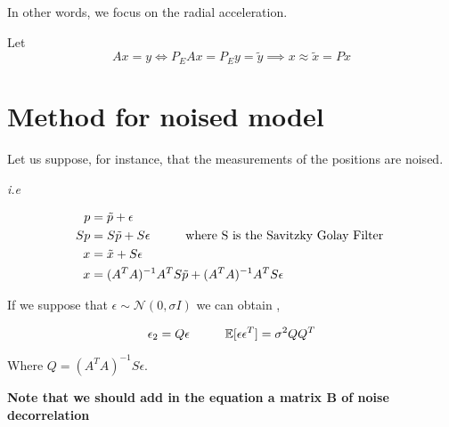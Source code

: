 \documentclass{article}
\begin{document}
In other words, we focus on the radial acceleration. 

Let \begin{equation*}
    A x = y \Leftrightarrow P_E A x =P_E y = \tilde{y}  
    \implies x \approx  \tilde{x} = Px
\end{equation*}


\section{Method for noised model }

Let us suppose, for instance, that the measurements of the positions are noised. 

\textit{i.e} 



\begin{align*}
    p &= \tilde{p} + \epsilon \\ 
    Sp &= S\tilde{p} + S\epsilon \text{\hspace{1 cm}where S is the Savitzky Golay Filter }\\
    x &= \tilde{x} + S\epsilon\\
    x &= (A^TA)^{-1} A^T  S \tilde{p} +  (A^TA)^{-1} A^T  S \epsilon 
\end{align*}

If we suppose that $ \epsilon \sim \mathcal{N}(0, \sigma I) $ we can obtain , 

\[   \epsilon_2 = Q \epsilon   \text{\hspace*{1 cm}} \mathbb{E}[\epsilon \epsilon^T]  = \sigma^2 Q Q^T  
\]

Where $Q = (A^T A)^{-1}S \epsilon$.

\textbf{Note that we should add in the equation a matrix B of noise decorrelation  }







\newpage


\end{document}
